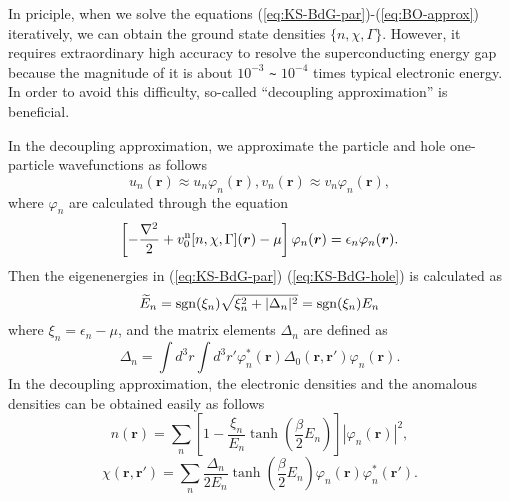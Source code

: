 In priciple, when we solve the equations (\ref{eq:KS-BdG-par})-(\ref{eq:BO-approx}) iteratively, 
we can obtain the ground state densities $\{n, \chi, \Gamma\}$.
However, it requires extraordinary high accuracy to resolve the superconducting energy gap
because the magnitude of it is about $10^{-3}$ \verb|~| $10^{-4}$ times typical electronic energy.
In order to avoid this difficulty, so-called ``decoupling approximation'' is beneficial.

In the decoupling approximation, we approximate the particle and hole one-particle wavefunctions as follows
%
\begin{equation}
	u_n(\bm{r}) \approx u_n\varphi_n(\bm{r}),   v_n(\bm{r}) \approx v_n\varphi_n(\bm{r}), 
	\label{eq:approx-wfc}
\end{equation}
%
where $\varphi_n$ are calculated through the equation
\begin{equation}
	\left[ -\frac{\nabla^2}{2} + v^{\rm n}_0[n, \chi, \Gamma](\bm{r}) - \mu \right]
	\varphi_n(\bm{r}) = \epsilon_n\varphi_n(\bm{r}).
	\label{eq:KS-eq}
\end{equation}
%
Then the eigenenergies in (\ref{eq:KS-BdG-par}) (\ref{eq:KS-BdG-hole}) is calculated as
%
\begin{equation}
	\widetilde{E}_n = {\rm sgn}(\xi_n)\sqrt{\xi^2_n + |\Delta_n|^2}
	                = {\rm sgn}(\xi_n) E_n
			\label{eq:KS-energy}
\end{equation}
%
where $\xi_n = \epsilon_n - \mu$, and the matrix elements $\Delta_n$ are defined as
%
\begin{equation}
	\Delta_n = \int d^3r\int d^3r' \varphi^{\ast}_n(\bm{r})\Delta_0(\bm{r}, \bm{r'})\varphi_n(\bm{r}).
	\label{eq:Deltan}
\end{equation}
%
In the decoupling approximation, the electronic densities and the anomalous densities 
can be obtained easily as follows
%
\begin{equation}
	n(\bm{r}) = \sum_{n} \left[1-\frac{\xi_n}{E_n}\tanh \left(\frac{\beta}{2}E_n \right) \right]
	                     |\varphi_n(\bm{r})|^2,
	\label{eq:el-density}
\end{equation}
%
\begin{equation}
	\chi(\bm{r}, \bm{r'}) = \sum_{n}\frac{\Delta_n}{2E_n}\tanh \left(\frac{\beta}{2}E_n \right)
	\varphi_n(\bm{r})\varphi^{\ast}_n(\bm{r'}).
	\label{eq:anom-density}
\end{equation}
%

